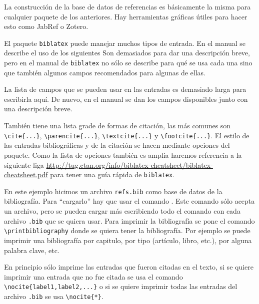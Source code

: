 La construcción de la base de datos de referencias es básicamente la misma
para cualquier paquete de los anteriores. Hay herramientas gráficas útiles
para hacer esto como JabRef o Zotero.

El paquete \texttt{biblatex} puede manejar muchos tipos de entrada. En el
manual se describe el uso de los siguientes
Son demasiados para dar una descripción breve, pero en el manual de
\texttt{biblatex} no sólo se describe para qué se usa cada una sino que
también algunos campos recomendados para algunas de ellas.

La lista de campos que se pueden usar en las entradas es demasiado larga para
escribirla aquí. De nuevo, en el manual se dan los campos disponibles junto
con una descripción breve.

También tiene una lista grade de formas de citación, las más comunes son
\verb|\cite{...}|, \verb|\parencite{...}|, \verb|\textcite{...}| y
\verb|\footcite{...}|. El estilo de las entradas bibliográficas y de la
citación se hacen mediante opciones del paquete. Como la lista de opciones
también es amplia haremos referencia a la siguiente liga
\url{http://tug.ctan.org/info/biblatex-cheatsheet/biblatex-cheatsheet.pdf}
para tener una guía rápida de \texttt{biblatex}.

En este ejemplo hicimos un archivo \texttt{refs.bib} como base de datos de la
bibliografía. Para \enquote{cargarlo} hay que usar el comando
\verb||. Este comando sólo acepta un archivo, pero
se pueden cargar más escribiendo todo el comando con cada archivo
\texttt{.bib} que se quiera usar. Para imprimir la bibliografía se pone el
comando \verb|\printbibliography| donde se quiera tener la bibliografía. Por
ejemplo se puede imprimir una bibliografía por capitulo, por tipo
(artículo, libro, etc.), por alguna palabra clave, etc.

En principio sólo imprime las entradas que fueron citadas en el texto, si se
quiere imprimir una entrada que no fue citada se usa el comando
\verb|\nocite{label1,label2,...}| o si se quiere imprimir todas las entradas
del archivo \texttt{.bib} se usa \verb|\nocite{*}|.

